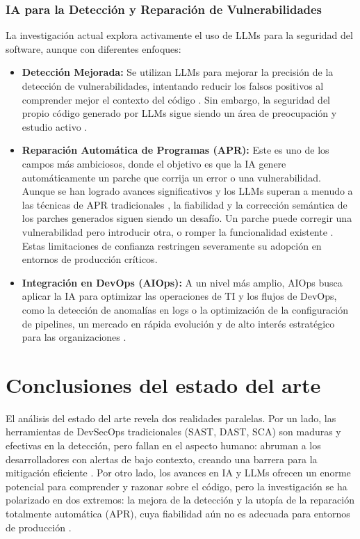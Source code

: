 \subsubsection{IA para la Detección y Reparación de Vulnerabilidades}
La investigación actual explora activamente el uso de LLMs para la seguridad del software, aunque con diferentes enfoques:
\begin{itemize}
    \item \textbf{Detección Mejorada:} Se utilizan LLMs para mejorar la precisión de la detección de vulnerabilidades, intentando reducir los falsos positivos al comprender mejor el contexto del código \cite{GitHubAICodeReviews}. Sin embargo, la seguridad del propio código generado por LLMs sigue siendo un área de preocupación y estudio activo \cite{GitGuardian2024CopilotConcerns}.
    
    \item \textbf{Reparación Automática de Programas (APR):} Este es uno de los campos más ambiciosos, donde el objetivo es que la IA genere automáticamente un parche que corrija un error o una vulnerabilidad. Aunque se han logrado avances significativos y los LLMs superan a menudo a las técnicas de APR tradicionales \cite{Liu2024APRSurvey}, la fiabilidad y la corrección semántica de los parches generados siguen siendo un desafío. Un parche puede corregir una vulnerabilidad pero introducir otra, o romper la funcionalidad existente \cite{Fu2023Patching}. Estas limitaciones de confianza restringen severamente su adopción en entornos de producción críticos.
    
    \item \textbf{Integración en DevOps (AIOps):} A un nivel más amplio, AIOps busca aplicar la IA para optimizar las operaciones de TI y los flujos de DevOps, como la detección de anomalías en logs o la optimización de la configuración de pipelines, un mercado en rápida evolución y de alto interés estratégico para las organizaciones \cite{Gartner2023AIOpsGuide}.
\end{itemize}

\section{Conclusiones del estado del arte}\label{sec:conclusionesSOTA}
El análisis del estado del arte revela dos realidades paralelas. Por un lado, las herramientas de DevSecOps tradicionales (SAST, DAST, SCA) son maduras y efectivas en la detección, pero fallan en el aspecto humano: abruman a los desarrolladores con alertas de bajo contexto, creando una barrera para la mitigación eficiente \cite{Johnson2023UsabilitySAST}. Por otro lado, los avances en IA y LLMs ofrecen un enorme potencial para comprender y razonar sobre el código, pero la investigación se ha polarizado en dos extremos: la mejora de la detección y la utopía de la reparación totalmente automática (APR), cuya fiabilidad aún no es adecuada para entornos de producción \cite{Liu2024APRSurvey}.

